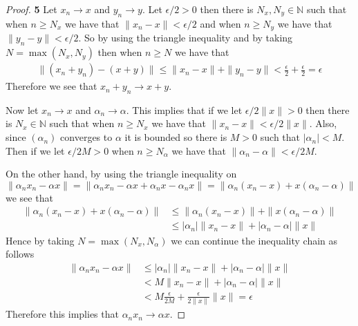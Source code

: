 \documentclass[11pt]{article}
\newcommand{\N}{\mathbb{N}}
\theoremstyle{definition}
\begin{document}
\begin{proof}{\textbf{5}}
    Let $x_n \to x$ and $y_n \to y$. Let $\epsilon/2 > 0$ then there is
    $N_x, N_y \in \N$ such that when $n \geq N_x$ we have that
    $\|x_n - x\| < \epsilon / 2$ and when $n \geq N_y$ we have that
    $\|y_n - y\| < \epsilon / 2$.
    So by using the triangle inequality and by taking $N = \max(N_x, N_y)$
    then when $n \geq N$ we have that
    \begin{align*}
        \|(x_n + y_n) - (x + y)\| \leq \|x_n - x\| + \|y_n - y\|
        < \frac{\epsilon}{2} + \frac{\epsilon}{2} = \epsilon
    \end{align*}
    Therefore we see that $x_n + y_n \to x + y$.

    Now let $x_n \to x$ and $\alpha_n \to \alpha$.
    This implies that if we let $\epsilon/2\|x\| > 0$ then there is
    $N_x \in \N$ such that when $n \geq N_x$ we have that
    $\|x_n - x\| < \epsilon/2\|x\|$.
    Also, since $(\alpha_n)$ converges to $\alpha$ it is bounded
    so there is $M > 0$ such that $|\alpha_n| < M$.
    Then if we let $\epsilon/2M > 0$ when $n \geq N_\alpha$ we have that
    $\|\alpha_n - \alpha\| < \epsilon/2M$.

    On the other hand, by using the triangle inequality on 
    $$\|\alpha_n x_n - \alpha x\|
    = \|\alpha_n x_n - \alpha x + \alpha_n x - \alpha_n x\|
    = \|\alpha_n(x_n - x) + x (\alpha_n - \alpha) \|$$
    we see that
    \begin{align*}
        \|\alpha_n(x_n - x) + x (\alpha_n - \alpha) \|
        &\leq \|\alpha_n(x_n - x)\| + \|x (\alpha_n - \alpha) \|\\
        &\leq |\alpha_n|\|x_n - x\| + |\alpha_n - \alpha|\|x \|
    \end{align*}
    Hence by taking $N = \max(N_x, N_\alpha)$ we can continue the inequality
    chain as follows
    \begin{align*}
        \|\alpha_nx_n - \alpha x\|
        &\leq |\alpha_n|\|x_n - x\| + |\alpha_n - \alpha|\|x \|\\
        &< M\|x_n - x\| + |\alpha_n - \alpha|\|x \|\\
        &< M\frac{\epsilon}{2M} + \frac{\epsilon}{2\|x\|} \|x \| = \epsilon
    \end{align*}
    Therefore this implies that $\alpha_n x_n \to \alpha x$.
\end{proof}
\cleardoublepage
\end{document}
